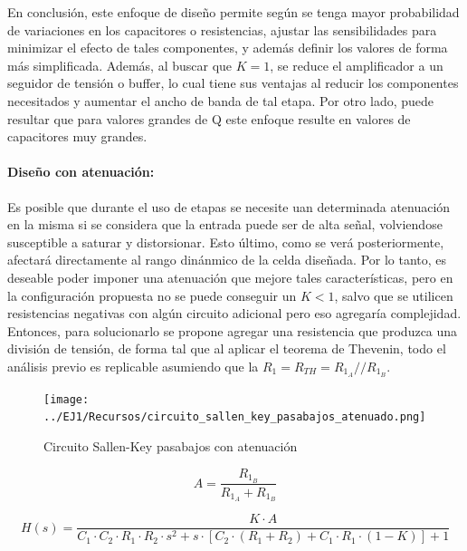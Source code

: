 En conclusi\'on, este enfoque de dise\~no permite seg\'un se tenga mayor probabilidad de variaciones en los capacitores o resistencias, ajustar las sensibilidades para minimizar el efecto de tales componentes,
y adem\'as definir los valores de forma m\'as simplificada. Adem\'as, al buscar que $K = 1$, se reduce el amplificador a un seguidor de tensi\'on o buffer, lo cual tiene sus ventajas al reducir los componentes necesitados
y aumentar el ancho de banda de tal etapa. Por otro lado, puede resultar que para valores grandes de Q este enfoque resulte en valores de capacitores muy grandes.

\paragraph{Dise\~no con atenuaci\'on:} Es posible que durante el uso de etapas se necesite uan determinada atenuaci\'on en la misma si se considera que la entrada puede ser de alta se\~nal, volviendose susceptible a saturar
y distorsionar. Esto \'ultimo, como se ver\'a posteriormente, afectar\'a directamente al rango din\'anmico de la celda dise\~nada. Por lo tanto, es deseable poder imponer una atenuaci\'on que mejore tales caracter\'isticas, pero en la
configuraci\'on propuesta no se puede conseguir un $K < 1$, salvo que se utilicen resistencias negativas con alg\'un circuito adicional pero eso agregar\'ia complejidad. Entonces, para solucionarlo se propone agregar una resistencia que produzca
una divisi\'on de tensi\'on, de forma tal que al aplicar el teorema de Thevenin, todo el an\'alisis previo es replicable asumiendo que la $R_1 = R_{TH} = R_{1_A} // R_{1_B}$.

\begin{figure}[H]
    \centering
    \texttt{[image: ../EJ1/Recursos/circuito\_sallen\_key\_pasabajos\_atenuado.png]}
    \caption{Circuito Sallen-Key pasabajos con atenuaci\'on}
    \label{fig:sallen_key_pasabajos_atenuado}
\end{figure}

\begin{equation}
    A = \frac{R_{1_B}}{R_{1_A} + R_{1_B}}
\end{equation}

\begin{equation}
    H(s) = \frac{K \cdot A}{C_1 \cdot C_2 \cdot R_1 \cdot R_2 \cdot s^{2} + s \cdot \left[ C_2 \cdot (R_1 + R_2) + C_1 \cdot R_1 \cdot (1 - K) \right] + 1}
    \label{eq:sallen_key_h_atenuada}
\end{equation}

